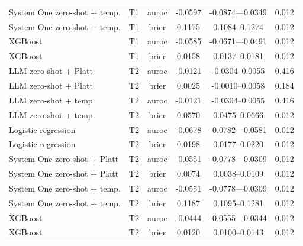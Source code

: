 \begin{table}[!t]
\begin{tabular}{lccccc}
System One zero-shot + temp. & T1 & auroc & -0.0597 & -0.0874---0.0349 & 0.012 \\
System One zero-shot + temp. & T1 & brier & 0.1175 & 0.1084--0.1274 & 0.012 \\
XGBoost & T1 & auroc & -0.0585 & -0.0671---0.0491 & 0.012 \\
XGBoost & T1 & brier & 0.0158 & 0.0137--0.0181 & 0.012 \\
LLM zero-shot + Platt & T2 & auroc & -0.0121 & -0.0304--0.0055 & 0.416 \\
LLM zero-shot + Platt & T2 & brier & 0.0025 & -0.0010--0.0058 & 0.184 \\
LLM zero-shot + temp. & T2 & auroc & -0.0121 & -0.0304--0.0055 & 0.416 \\
LLM zero-shot + temp. & T2 & brier & 0.0570 & 0.0475--0.0666 & 0.012 \\
Logistic regression & T2 & auroc & -0.0678 & -0.0782---0.0581 & 0.012 \\
Logistic regression & T2 & brier & 0.0198 & 0.0177--0.0220 & 0.012 \\
System One zero-shot + Platt & T2 & auroc & -0.0551 & -0.0778---0.0309 & 0.012 \\
System One zero-shot + Platt & T2 & brier & 0.0074 & 0.0038--0.0109 & 0.012 \\
System One zero-shot + temp. & T2 & auroc & -0.0551 & -0.0778---0.0309 & 0.012 \\
System One zero-shot + temp. & T2 & brier & 0.1187 & 0.1095--0.1281 & 0.012 \\
XGBoost & T2 & auroc & -0.0444 & -0.0555---0.0344 & 0.012 \\
XGBoost & T2 & brier & 0.0120 & 0.0100--0.0143 & 0.012 \\
\hline
\end{tabular}
\end{table}